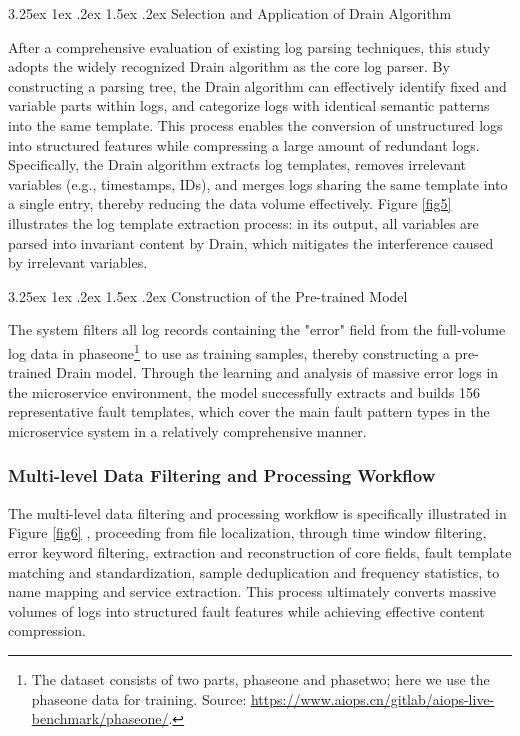 \documentclass[10pt]{article}
\makeatletter
\let\oldref\ref
\renewcommand{\ref}[1]{%
    \textcolor{blue}{\oldref{#1}}%
}
\renewcommand{\paragraph}{%
    \@startsection{paragraph}{4}{\z@}%
    {3.25ex \@plus1ex \@minus.2ex}%
    {1.5ex \@plus.2ex}%
    {\normalfont\normalsize\itshape}%
}
\makeatother
\begin{document}
\paragraph{Selection and Application of Drain Algorithm}

After a comprehensive evaluation of existing log parsing techniques, this study adopts the widely recognized Drain algorithm as the core log parser. By constructing a parsing tree, the Drain algorithm can effectively identify fixed and variable parts within logs, and categorize logs with identical semantic patterns into the same template. This process enables the conversion of unstructured logs into structured features while compressing a large amount of redundant logs. Specifically, the Drain algorithm extracts log templates, removes irrelevant variables (e.g., timestamps, IDs), and merges logs sharing the same template into a single entry, thereby reducing the data volume effectively. Figure \ref{fig5} illustrates the log template extraction process: in its output, all variables are parsed into invariant content by Drain, which mitigates the interference caused by irrelevant variables.

\paragraph{Construction of the Pre-trained Model}

The system filters all log records containing the "error" field from the full-volume log data in phaseone\footnote{The dataset consists of two parts, phaseone and phasetwo; here we use the phaseone data for training. Source: \url{https://www.aiops.cn/gitlab/aiops-live-benchmark/phaseone/}.} to use as training samples, thereby constructing a pre-trained Drain model. Through the learning and analysis of massive error logs in the microservice environment, the model successfully extracts and builds 156 representative fault templates, which cover the main fault pattern types in the microservice system in a relatively comprehensive manner.

\subsubsection{Multi-level Data Filtering and Processing Workflow}

The multi-level data filtering and processing workflow is specifically illustrated in Figure \ref{fig6}, proceeding from file localization, through time window filtering, error keyword filtering, extraction and reconstruction of core fields, fault template matching and standardization, sample deduplication and frequency statistics, to name mapping and service extraction. This process ultimately converts massive volumes of logs into structured fault features while achieving effective content compression.
\end{document}
